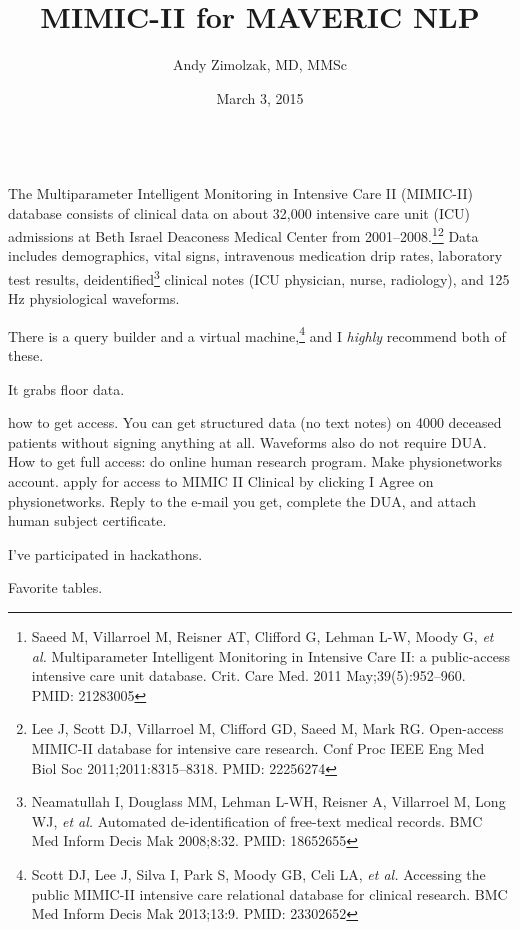 \documentclass{tufte-handout}
\title{MIMIC-II for MAVERIC NLP}
\author{Andy Zimolzak, MD, MMSc}
\date{March 3, 2015}
\begin{document}
\maketitle

~\\

The Multiparameter Intelligent Monitoring in Intensive Care II
(MIMIC-II) database consists of clinical data on about 32,000
intensive care unit (ICU) admissions at Beth Israel Deaconess Medical
Center from 2001--2008.\footnote{Saeed M, Villarroel M, Reisner AT,
  Clifford G, Lehman L-W, Moody G, \emph{et al.} Multiparameter
  Intelligent Monitoring in Intensive Care II: a public-access
  intensive care unit database. Crit. Care Med. 2011
  May;39(5):952–960. PMID: 21283005}\footnote{Lee J, Scott DJ,
  Villarroel M, Clifford GD, Saeed M, Mark RG. Open-access MIMIC-II
  database for intensive care research. Conf Proc IEEE Eng Med Biol
  Soc 2011;2011:8315–8318. PMID: 22256274} Data includes demographics,
vital signs, intravenous medication drip rates, laboratory test
results, deidentified\footnote{Neamatullah I, Douglass MM, Lehman
  L-WH, Reisner A, Villarroel M, Long WJ, \emph{et al.} Automated
  de-identification of free-text medical records. BMC Med Inform Decis
  Mak 2008;8:32. PMID: 18652655 } clinical notes (ICU physician,
nurse, radiology), and 125 Hz physiological waveforms.

There is a query builder and a virtual machine,\footnote{Scott DJ, Lee
  J, Silva I, Park S, Moody GB, Celi LA, \emph{et al.} Accessing the
  public MIMIC-II intensive care relational database for clinical
  research. BMC Med Inform Decis Mak 2013;13:9. PMID: 23302652 } and I
\emph{highly} recommend both of these.

It grabs floor data.

how to get access. You can get structured data (no text notes) on 4000
deceased patients without signing anything at all. Waveforms also do
not require DUA. How to get full access: do online human research
program. Make physionetworks account. apply for access to MIMIC II
Clinical by clicking I Agree on physionetworks. Reply to the e-mail
you get, complete the DUA, and attach human subject certificate.

I've participated in hackathons.

Favorite tables.
\end{document}
